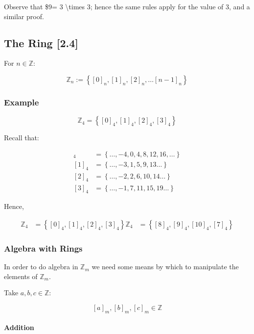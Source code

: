\documentclass[
]{article}
\begin{document}
Observe that \$9= 3 \textbackslash times 3; hence the same rules apply
for the value of 3, and a similar proof.

\hypertarget{header-n670}{%
\subsection{The Ring {[}2.4{]}}\label{header-n670}}

For \(n \in \mathbb{Z}\):

\[\mathbb{Z}_n := \left \{ [0]_n, [1]_n, [2]_n, \dots [n-1]_n  \right \}\]

\hypertarget{header-n674}{%
\subsubsection{Example}\label{header-n674}}

\[\mathbb{Z}_4 =\left \{ [0]_4, [1]_4, [2]_4, [3]_4 \right \}\]

Recall that:

\begin{align}
[0]_4 &= \left \{  \dots, -4, 0, 4, 8, 12, 16, \dots \right \} \\
[1]_4 &= \left \{  \dots, -3, 1, 5, 9, 13 \dots \right \} \\
[2]_4 &= \left \{  \dots, -2, 2, 6, 10, 14 \dots \right \} \\
[3]_4 &= \left \{  \dots, -1, 7, 11, 15, 19 \dots \right \}
\end{align}

Hence,

\begin{align}
 \mathbb{Z}_4 &= \left \{ [0]_4, [1]_4, [2]_4, [3]_4 \right \}
 \mathbb{Z}_4 &= \left \{ [8]_4, [9]_4, [10]_4, [7]_4 \right \}
\end{align}

\hypertarget{header-n681}{%
\subsubsection{Algebra with Rings}\label{header-n681}}

In order to do algebra in \(\mathbb{Z}_m\) we need some means by which
to manipulate the elements of \(\mathbb{Z}_m\).

Take \(a, b, c \in \mathbb{Z}\):

\[[a]_m, [b]_m, [c]_m \in \mathbb{Z}\]

\hypertarget{header-n685}{%
\paragraph{Addition}\label{header-n685}}
\end{document}

